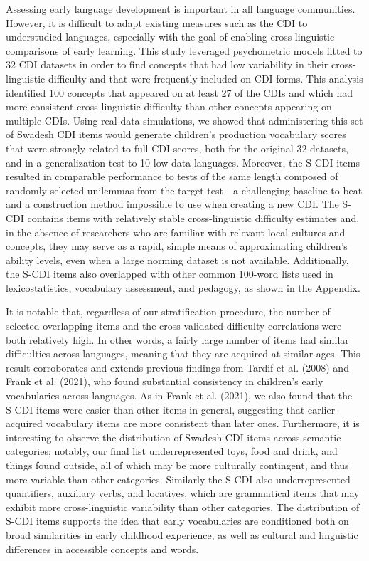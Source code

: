 \documentclass[
  letterpaper,
  DIV=11,
  numbers=noendperiod]{scrartcl}
\begin{document}
Assessing early language development is important in all language
communities. However, it is difficult to adapt existing measures such as
the CDI to understudied languages, especially with the goal of enabling
cross-linguistic comparisons of early learning. This study leveraged
psychometric models fitted to 32 CDI datasets in order to find concepts
that had low variability in their cross-linguistic difficulty and that
were frequently included on CDI forms. This analysis identified 100
concepts that appeared on at least 27 of the CDIs and which had more
consistent cross-linguistic difficulty than other concepts appearing on
multiple CDIs. Using real-data simulations, we showed that administering
this set of Swadesh CDI items would generate children's production
vocabulary scores that were strongly related to full CDI scores, both
for the original 32 datasets, and in a generalization test to 10
low-data languages. Moreover, the S-CDI items resulted in comparable
performance to tests of the same length composed of randomly-selected
unilemmas from the target test---a challenging baseline to beat and a
construction method impossible to use when creating a new CDI. The S-CDI
contains items with relatively stable cross-linguistic difficulty
estimates and, in the absence of researchers who are familiar with
relevant local cultures and concepts, they may serve as a rapid, simple
means of approximating children's ability levels, even when a large
norming dataset is not available. Additionally, the S-CDI items also
overlapped with other common 100-word lists used in lexicostatistics,
vocabulary assessment, and pedagogy, as shown in the Appendix.

It is notable that, regardless of our stratification procedure, the
number of selected overlapping items and the cross-validated difficulty
correlations were both relatively high. In other words, a fairly large
number of items had similar difficulties across languages, meaning that
they are acquired at similar ages. This result corroborates and extends
previous findings from Tardif et al. (2008) and Frank et al. (2021), who
found substantial consistency in children's early vocabularies across
languages. As in Frank et al. (2021), we also found that the S-CDI items
were easier than other items in general, suggesting that
earlier-acquired vocabulary items are more consistent than later ones.
Furthermore, it is interesting to observe the distribution of
Swadesh-CDI items across semantic categories; notably, our final list
underrepresented toys, food and drink, and things found outside, all of
which may be more culturally contingent, and thus more variable than
other categories. Similarly the S-CDI also underrepresented quantifiers,
auxiliary verbs, and locatives, which are grammatical items that may
exhibit more cross-linguistic variability than other categories. The
distribution of S-CDI items supports the idea that early vocabularies
are conditioned both on broad similarities in early childhood
experience, as well as cultural and linguistic differences in accessible
concepts and words.
\end{document}
